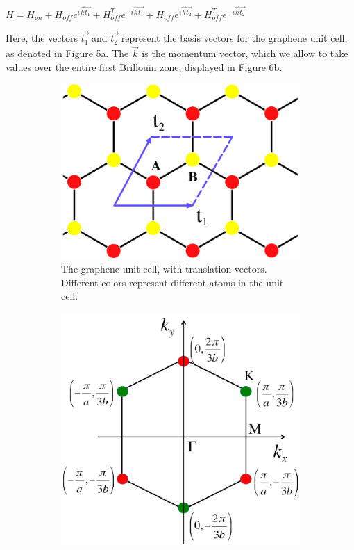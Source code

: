 \documentclass[11pt]{article}
\begin{document}
$H = H_{on} + H_{off}e^{i\vec{k}\vec{t_1}} + H^T_{off}e^{-i\vec{k}\vec{t_1}} + H_{off}e^{i\vec{k}\vec{t_2}} + H^T_{off}e^{-i\vec{k}\vec{t_2}}$

Here, the vectors $\vec{t_1}$ and $\vec{t_2}$ represent the basis vectors for the graphene unit cell, as denoted in Figure 5a. The $\vec{k}$ is the momentum vector, which we allow to take values over the entire first Brillouin zone, displayed in Figure 6b. 

\begin{figure}[h!]
\centering
\begin{subfigure}[b]{0.3\textwidth}
        \includegraphics[width=\textwidth]{graphene_unit_cell.png}
        \caption{The graphene unit cell, with translation vectors. Different colors represent different atoms in the unit cell.}
\end{subfigure}
\begin{subfigure}[b]{0.3\textwidth}
        \includegraphics[width=\textwidth]{Figure-5-Graphene-first-Brillouin-zone}

\end{subfigure}
\end{figure}
\end{document}
